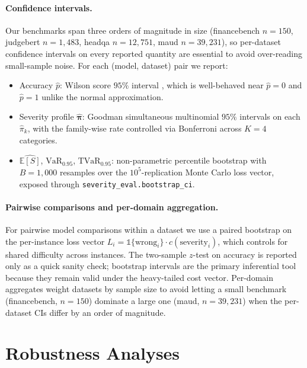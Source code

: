\documentclass[11pt]{article}
\newcommand{\ES}{\mathbb{E}[S]}
\newcommand{\VaR}{\mathrm{VaR}}
\newcommand{\TVaR}{\mathrm{TVaR}}
\newcommand{\bpi}{\boldsymbol{\pi}}
\begin{document}
\paragraph{Confidence intervals.}
Our benchmarks span three orders of magnitude in size
(financebench $n{=}150$, judgebert $n{=}1{,}483$, headqa
$n{=}12{,}751$, maud $n{=}39{,}231$), so per-dataset confidence
intervals on every reported quantity are essential to avoid
over-reading small-sample noise. For each (model, dataset) pair
we report:
\begin{itemize}
  \item Accuracy $\hat{p}$: Wilson score $95\%$ interval
    \citep{wilson1927ci}, which is well-behaved near
    $\hat{p}{=}0$ and $\hat{p}{=}1$ unlike the normal
    approximation.
  \item Severity profile $\hat{\bpi}$: Goodman simultaneous
    multinomial $95\%$ intervals on each $\hat{\pi}_k$, with the
    family-wise rate controlled via Bonferroni across $K{=}4$
    categories.
  \item $\widehat{\ES}$, $\VaR_{0.95}$, $\TVaR_{0.95}$:
    non-parametric percentile bootstrap with $B{=}1{,}000$
    resamples over the $10^5$-replication Monte Carlo loss
    vector, exposed through
    \texttt{severity\_eval.bootstrap\_ci}.
\end{itemize}

\paragraph{Pairwise comparisons and per-domain aggregation.}
For pairwise model comparisons within a dataset we use a paired
bootstrap on the per-instance loss vector
$L_i = \mathbb{1}\{\text{wrong}_i\} \cdot c(\text{severity}_i)$,
which controls for shared difficulty across instances. The
two-sample $z$-test on accuracy is reported only as a quick
sanity check; bootstrap intervals are the primary inferential
tool because they remain valid under the heavy-tailed cost
vector. Per-domain aggregates weight datasets by sample size to
avoid letting a small benchmark (financebench, $n{=}150$)
dominate a large one (maud, $n{=}39{,}231$) when the per-dataset
CIs differ by an order of magnitude.

\section{Robustness Analyses}
\label{sec:app-robustness}
\end{document}
